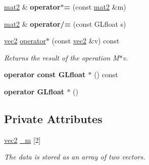 \begin{DoxyCompactItemize}
\item 
\hypertarget{class_angel_1_1mat2_ae473dedc654b83baa25a34f9d5e9061f}{\hyperlink{class_angel_1_1mat2}{mat2} \& {\bfseries operator$\ast$=} (const \hyperlink{class_angel_1_1mat2}{mat2} \&m)}\label{class_angel_1_1mat2_ae473dedc654b83baa25a34f9d5e9061f}

\item 
\hypertarget{class_angel_1_1mat2_ad72c91bf3c2d1ea79a0ee67f50b3dda6}{\hyperlink{class_angel_1_1mat2}{mat2} \& {\bfseries operator/=} (const G\-Lfloat s)}\label{class_angel_1_1mat2_ad72c91bf3c2d1ea79a0ee67f50b3dda6}

\item 
\hyperlink{struct_angel_1_1vec2}{vec2} \hyperlink{class_angel_1_1mat2_a1be53f556f8dd39cc2a95c0168319129}{operator$\ast$} (const \hyperlink{struct_angel_1_1vec2}{vec2} \&v) const 
\begin{DoxyCompactList}\small\item\em Returns the result of the operation M$\ast$v. \end{DoxyCompactList}\item 
\hypertarget{class_angel_1_1mat2_a413f7a4b589ff434f6a4f3a2bf2e3238}{{\bfseries operator const G\-Lfloat $\ast$} () const }\label{class_angel_1_1mat2_a413f7a4b589ff434f6a4f3a2bf2e3238}

\item 
\hypertarget{class_angel_1_1mat2_a1964937b0ce62e819edb23c8eeee9ddc}{{\bfseries operator G\-Lfloat $\ast$} ()}\label{class_angel_1_1mat2_a1964937b0ce62e819edb23c8eeee9ddc}

\end{DoxyCompactItemize}
\subsection*{Private Attributes}
\begin{DoxyCompactItemize}
\item 
\hyperlink{struct_angel_1_1vec2}{vec2} \hyperlink{class_angel_1_1mat2_a04ca47b08412fa9c9ed5067843df53e9}{\-\_\-m} \mbox{[}2\mbox{]}
\begin{DoxyCompactList}\small\item\em The data is stored as an array of two vectors. \end{DoxyCompactList}\end{DoxyCompactItemize}
